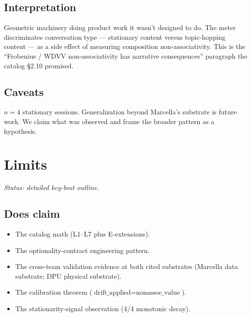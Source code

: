 \documentclass[11pt,letterpaper]{article}
\begin{document}
\subsection{Interpretation}

Geometric machinery doing product work it wasn't designed to do. The
meter discriminates conversation type --- stationary content versus
topic-hopping content --- as a side effect of measuring composition
non-associativity. This is the ``Frobenius / WDVV non-associativity
has narrative consequences'' paragraph the catalog \S2.10 promised.

\subsection{Caveats}

$n = 4$ stationary sessions. Generalization beyond Marcella's
substrate is future work. We claim what was observed and frame the
broader pattern as a hypothesis.


\section{Limits}
\label{sec:limits}

\noindent\emph{Status: detailed key-beat outline.}

\subsection{Does claim}
\begin{itemize}[nosep]
\item The catalog math (L1--L7 plus E-extensions).
\item The optionality-contract engineering pattern.
\item The cross-team validation evidence at both cited substrates
  (Marcella data substrate; DPU physical substrate).
\item The calibration theorem
  ($\text{drift\_applied} = \text{nonassoc\_value}$).
\item The stationarity-signal observation (4/4 monotonic decay).
\end{itemize}
\end{document}
